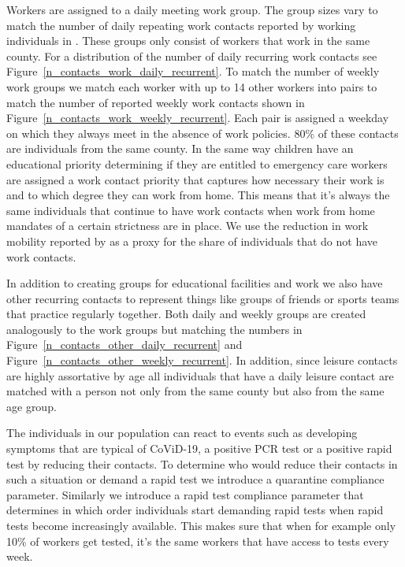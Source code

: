 Workers are assigned to a daily meeting work group. The group sizes vary to match the
number of daily repeating work contacts reported by working individuals in
\cite{Mossong2008}. These groups only consist of workers that work in the same county.
For a distribution of the number of daily recurring work contacts see
Figure~\ref{n_contacts_work_daily_recurrent}. To match the number of weekly work groups
we match each worker with up to 14 other workers into pairs to match the number of
reported weekly work contacts shown in Figure~\ref{n_contacts_work_weekly_recurrent}.
Each pair is assigned a weekday on which they always meet in the absence of work
policies. 80\% of these contacts are individuals from the same county.
In the same way children have an educational priority determining if they are entitled to
emergency care workers are assigned a work contact priority that captures how necessary
their work is and to which degree they can work from home. This means that it's always
the same individuals that continue to have work contacts when work from home mandates of
a certain strictness are in place. We use the reduction in work mobility reported by
\cite{Google2021} as a proxy for the share of individuals that do not have work contacts.

In addition to creating groups for educational facilities and work we also have other
recurring contacts to represent things like groups of friends or sports teams that
practice regularly together. Both daily and weekly groups are created analogously to the
work groups but matching the numbers in Figure~\ref{n_contacts_other_daily_recurrent} and
Figure~\ref{n_contacts_other_weekly_recurrent}. In addition, since leisure contacts are
highly assortative by age all individuals that have a daily leisure contact are matched
with a person not only from the same county but also from the same age group.

The individuals in our population can react to events such as developing symptoms that
are typical of CoViD-19, a positive PCR test or a positive rapid test by reducing their
contacts. To determine who would reduce their contacts in such a situation or demand a
rapid test we introduce a quarantine compliance parameter. Similarly we introduce a rapid
test compliance parameter that determines in which order individuals start demanding
rapid tests when rapid tests become increasingly available. This makes sure that when for
example only 10\% of workers get tested, it's the same workers that have access to tests
every week.

